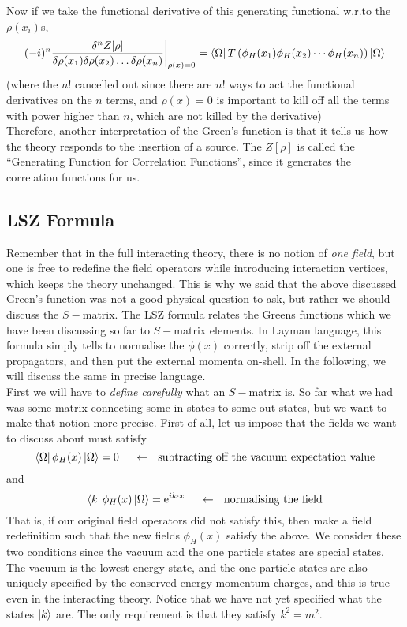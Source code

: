 \documentclass[11pt, notitlepage]{report}
\newcommand{\e}{\mathrm{e}}
\numberwithin{equation}{section}
\begin{document}
Now if we take the functional derivative of this generating functional w.r.to the \(\rho(x_i)\)s, 
\begin{equation*}
    (-i)^n\frac{\delta^n Z[\rho]}{\delta \rho(x_1)\delta \rho(x_2) \ldots {\delta \rho(x_n)}} \bigg|_{\rho(x) = 0}= \bra{\Omega} T\left(  \phi_H(x_1)\phi_H(x_2)\cdots \phi_H(x_n) \right) \ket{\Omega}
\end{equation*}
(where the \(n!\) cancelled out since there are \(n!\) ways to act the functional derivatives on the \(n\) terms, and \(\rho(x)=0\) is important to kill off all the terms with power higher than \(n\), which are not killed by the derivative)\\

Therefore, another interpretation of the Green's function is that it tells us how the theory responds to the insertion of a source. The \(Z[\rho]\) is called the ``Generating Function for Correlation Functions'', since it generates the correlation functions for us.

\subsection{LSZ Formula}  
Remember that in the full interacting theory, there is no notion of \textit{one field}, but one is free to redefine the field operators while introducing interaction vertices, which keeps the theory unchanged. This is why we said that the above discussed Green's function was not a good physical question to ask, but rather we should discuss the \(S-\)matrix.
The LSZ formula relates the Greens functions which we have been discussing so far to \(S-\)matrix elements. In Layman language, this formula simply tells to normalise the \(\phi(x)\) correctly, strip off the external propagators, and then put the external momenta on-shell. In the following, we will discuss the same in precise language.\\

First we will have to \textit{define carefully} what an \(S-\)matrix is. So far what we had was some matrix connecting some in-states to some out-states, but we want to make that notion more precise. First of all, let us impose that the fields we want to discuss about must satisfy  
\begin{equation*}
    \bra{\Omega} \phi_H(x) \ket{\Omega} = 0 ~~~~\leftarrow \text{~ subtracting off the vacuum expectation value}
\end{equation*}
and 
\begin{equation*}
    \bra{k} \phi_H(x) \ket{\Omega} = \e^{ik\cdot x}~~~~\leftarrow \text{~ normalising the field}
\end{equation*}
That is, if our original field operators did not satisfy this, then make a field redefinition such that the new fields \(\phi_H(x)\) satisfy the above. We consider these two conditions since the vacuum and the one particle states are special states. The vacuum is the lowest energy state, and the one particle states are also uniquely specified by the conserved energy-momentum charges, and this is true even in the interacting theory. Notice that we have not yet specified what the states \(\ket{k}\) are. The only requirement is that they satisfy \(k^2= m^2\). \\
\end{document}
